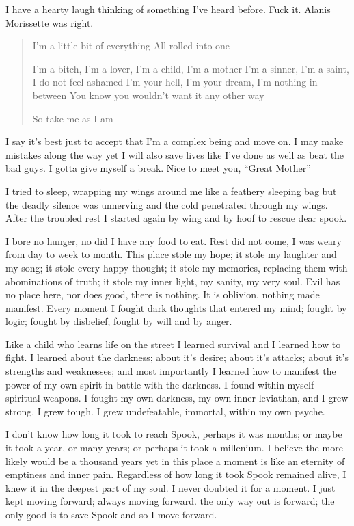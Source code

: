 I have a hearty laugh thinking of something I've heard before. Fuck it. Alanis Morissette was right.

\begin{quote}
	I'm a little bit of everything
	All rolled into one
	
	I'm a bitch, I'm a lover, I'm a child, I'm a mother
	I'm a sinner, I'm a saint, I do not feel ashamed
	I'm your hell, I'm your dream, I'm nothing in between
	You know you wouldn't want it any other way
	
	So take me as I am
\end{quote}

 I say it's best just to accept that I'm a complex being and move on. I may make mistakes along the way yet I will also save lives like I've done as well as beat the bad guys. I gotta give myself a break. Nice to meet you, ``Great Mother''
 
 I tried to sleep, wrapping my wings around me like a feathery sleeping bag but the deadly silence was unnerving and the cold penetrated through my wings. After the troubled rest I started again by wing and by hoof to rescue dear spook.
 
 \parasep
 
 I bore no hunger, no did I have any food to eat. Rest did not come, I was weary from day to week to month. This place stole my hope; it stole my laughter and my song; it stole every happy thought; it stole my memories, replacing them with abominations of truth; it stole my inner light, my sanity, my very soul. Evil has no place here, nor does good, there is nothing. It is oblivion, nothing made manifest. Every moment I fought dark thoughts that entered my mind; fought by logic; fought by disbelief; fought by will and by anger.
 
 Like a child who learns life on the street I learned survival and I learned how to fight. I learned about the darkness; about it's desire; about it's attacks; about it's strengths and weaknesses; and most importantly I learned how to manifest the power of my own spirit in battle with the darkness. I found within myself spiritual weapons. I fought my own darkness, my own inner leviathan, and I grew strong. I grew tough. I grew undefeatable, immortal, within my own psyche.
 
 I don't know how long it took to reach Spook, perhaps it was months; or maybe it took a year, or many years; or perhaps it took a millenium. I believe the more likely would be a thousand years yet in this place a moment is like an eternity of emptiness and inner pain. Regardless of how long it took Spook remained alive, I knew it in the deepest part of my soul. I never doubted it for a moment. I just kept moving forward; always moving forward. the only way out is forward; the only good is to save Spook and so I move forward.
 
